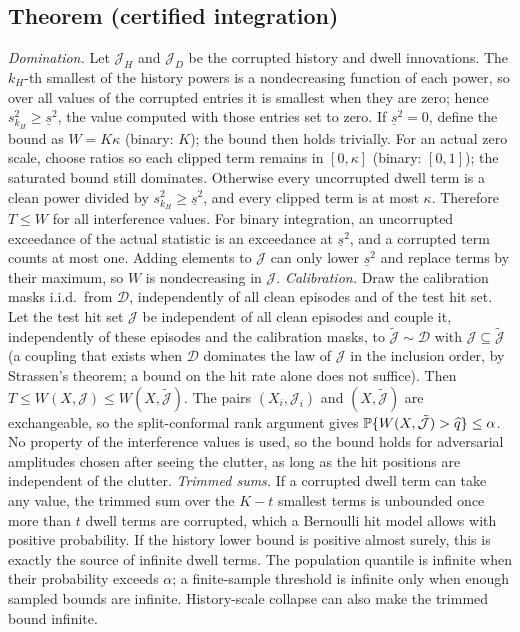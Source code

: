 \subsection{Theorem (certified integration)}
\emph{Domination.} Let $\mathcal J_H$ and $\mathcal J_D$ be the corrupted history and dwell innovations. The $k_H$-th smallest of the history powers is a nondecreasing function of each power, so over all values of the corrupted entries it is smallest when they are zero; hence $s_{k_H}^2\ge\underline s^2$, the value computed with those entries set to zero. If $\underline s^2=0$, define the bound as $W=K\kappa$ (binary: $K$); the bound then holds trivially. For an actual zero scale, choose ratios so each clipped term remains in $[0,\kappa]$ (binary: $[0,1]$); the saturated bound still dominates. Otherwise every uncorrupted dwell term is a clean power divided by $s_{k_H}^2\ge\underline s^2$, and every clipped term is at most $\kappa$. Therefore $T\le W$ for all interference values. For binary integration, an uncorrupted exceedance of the actual statistic is an exceedance at $\underline s^2$, and a corrupted term counts at most one. Adding elements to $\mathcal J$ can only lower $\underline s^2$ and replace terms by their maximum, so $W$ is nondecreasing in $\mathcal J$.
\emph{Calibration.} Draw the calibration masks i.i.d.\ from $\mathcal D$, independently of all clean episodes and of the test hit set. Let the test hit set $\mathcal J$ be independent of all clean episodes and couple it, independently of these episodes and the calibration masks, to $\tilde{\mathcal J}\sim\mathcal D$ with $\mathcal J\subseteq\tilde{\mathcal J}$ (a coupling that exists when $\mathcal D$ dominates the law of $\mathcal J$ in the inclusion order, by Strassen's theorem; a bound on the hit rate alone does not suffice). Then $T\le W(X,\mathcal J)\le W(X,\tilde{\mathcal J})$. The pairs $(X_i,\mathcal J_i)$ and $(X,\tilde{\mathcal J})$ are exchangeable, so the split-conformal rank argument gives $\mathbb{P}\{W(X,\tilde{\mathcal J})>\widehat q\}\le\alpha$. No property of the interference values is used, so the bound holds for adversarial amplitudes chosen after seeing the clutter, as long as the hit positions are independent of the clutter.
\emph{Trimmed sums.} If a corrupted dwell term can take any value, the trimmed sum over the $K-t$ smallest terms is unbounded once more than $t$ dwell terms are corrupted, which a Bernoulli hit model allows with positive probability. If the history lower bound is positive almost surely, this is exactly the source of infinite dwell terms. The population quantile is infinite when their probability exceeds $\alpha$; a finite-sample threshold is infinite only when enough sampled bounds are infinite. History-scale collapse can also make the trimmed bound infinite.

